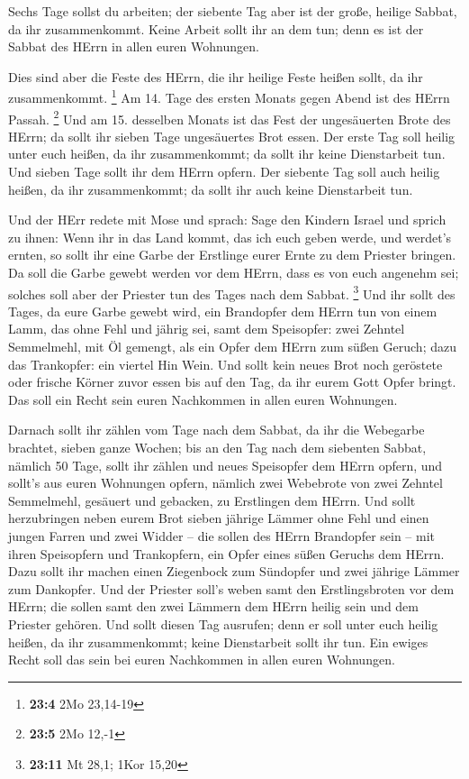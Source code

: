  Sechs Tage sollst du arbeiten; der siebente Tag aber ist
der große, heilige Sabbat, da ihr zusammenkommt. Keine Arbeit sollt ihr
an dem tun; denn es ist der Sabbat des HErrn in allen euren Wohnungen.

 Dies sind aber die Feste des HErrn, die ihr heilige Feste
heißen sollt, da ihr zusammenkommt. \footnote{\textbf{23:4} 2Mo 23,14-19}
 Am 14. Tage des ersten Monats gegen Abend ist des HErrn
Passah. \footnote{\textbf{23:5} 2Mo 12,-1}  Und am 15.
desselben Monats ist das Fest der ungesäuerten Brote des HErrn; da sollt
ihr sieben Tage ungesäuertes Brot essen.  Der erste Tag soll
heilig unter euch heißen, da ihr zusammenkommt; da sollt ihr keine
Dienstarbeit tun.  Und sieben Tage sollt ihr dem HErrn
opfern. Der siebente Tag soll auch heilig heißen, da ihr zusammenkommt;
da sollt ihr auch keine Dienstarbeit tun.

 Und der HErr redete mit Mose und sprach:  Sage
den Kindern Israel und sprich zu ihnen: Wenn ihr in das Land kommt, das
ich euch geben werde, und werdet's ernten, so sollt ihr eine Garbe der
Erstlinge eurer Ernte zu dem Priester bringen.  Da soll die
Garbe gewebt werden vor dem HErrn, dass es von euch angenehm sei;
solches soll aber der Priester tun des Tages nach dem Sabbat.
\footnote{\textbf{23:11} Mt 28,1; 1Kor 15,20}  Und ihr
sollt des Tages, da eure Garbe gewebt wird, ein Brandopfer dem HErrn tun
von einem Lamm, das ohne Fehl und jährig sei,  samt dem
Speisopfer: zwei Zehntel Semmelmehl, mit Öl gemengt, als ein Opfer dem
HErrn zum süßen Geruch; dazu das Trankopfer: ein viertel Hin Wein.
 Und sollt kein neues Brot noch geröstete oder frische
Körner zuvor essen bis auf den Tag, da ihr eurem Gott Opfer bringt. Das
soll ein Recht sein euren Nachkommen in allen euren Wohnungen.

 Darnach sollt ihr zählen vom Tage nach dem Sabbat, da ihr
die Webegarbe brachtet, sieben ganze Wochen;  bis an den
Tag nach dem siebenten Sabbat, nämlich 50 Tage, sollt ihr zählen und
neues Speisopfer dem HErrn opfern,  und sollt's aus euren
Wohnungen opfern, nämlich zwei Webebrote von zwei Zehntel Semmelmehl,
gesäuert und gebacken, zu Erstlingen dem HErrn.  Und sollt
herzubringen neben eurem Brot sieben jährige Lämmer ohne Fehl und einen
jungen Farren und zwei Widder -- die sollen des HErrn Brandopfer sein --
mit ihren Speisopfern und Trankopfern, ein Opfer eines süßen Geruchs dem
HErrn.  Dazu sollt ihr machen einen Ziegenbock zum
Sündopfer und zwei jährige Lämmer zum Dankopfer.  Und der
Priester soll's weben samt den Erstlingsbroten vor dem HErrn; die sollen
samt den zwei Lämmern dem HErrn heilig sein und dem Priester gehören.
 Und sollt diesen Tag ausrufen; denn er soll unter euch
heilig heißen, da ihr zusammenkommt; keine Dienstarbeit sollt ihr tun.
Ein ewiges Recht soll das sein bei euren Nachkommen in allen euren
Wohnungen.

